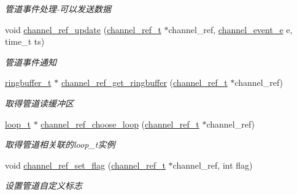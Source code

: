 \begin{DoxyCompactItemize}
\begin{DoxyCompactList}\small\item\em 管道事件处理-\/可以发送数据 \end{DoxyCompactList}\item 
void \hyperlink{a00047_aac9295d2423894326c8b62e0ee851f89_aac9295d2423894326c8b62e0ee851f89}{channel\+\_\+ref\+\_\+update} (\hyperlink{a00050_a151271c9d188ef28d4d24bb81dcc1263_a151271c9d188ef28d4d24bb81dcc1263}{channel\+\_\+ref\+\_\+t} $\ast$channel\+\_\+ref, \hyperlink{a00050_a5ad43ab162fdf9ad53cde10ed3d87d99_a5ad43ab162fdf9ad53cde10ed3d87d99}{channel\+\_\+event\+\_\+e} e, time\+\_\+t ts)
\begin{DoxyCompactList}\small\item\em 管道事件通知 \end{DoxyCompactList}\item 
\hyperlink{a00050_af929c5cf86b6a0f64dde407dfe60482e_af929c5cf86b6a0f64dde407dfe60482e}{ringbuffer\+\_\+t} $\ast$ \hyperlink{a00047_a7f81588a2beaa8c33a5eb7bf2236e566_a7f81588a2beaa8c33a5eb7bf2236e566}{channel\+\_\+ref\+\_\+get\+\_\+ringbuffer} (\hyperlink{a00050_a151271c9d188ef28d4d24bb81dcc1263_a151271c9d188ef28d4d24bb81dcc1263}{channel\+\_\+ref\+\_\+t} $\ast$channel\+\_\+ref)
\begin{DoxyCompactList}\small\item\em 取得管道读缓冲区 \end{DoxyCompactList}\item 
\hyperlink{a00050_a9c3ad1cd2de83e09f3a7b59fa82c94ee_a9c3ad1cd2de83e09f3a7b59fa82c94ee}{loop\+\_\+t} $\ast$ \hyperlink{a00047_af3fce9f1faac3773f726b1b913d42787_af3fce9f1faac3773f726b1b913d42787}{channel\+\_\+ref\+\_\+choose\+\_\+loop} (\hyperlink{a00050_a151271c9d188ef28d4d24bb81dcc1263_a151271c9d188ef28d4d24bb81dcc1263}{channel\+\_\+ref\+\_\+t} $\ast$channel\+\_\+ref)
\begin{DoxyCompactList}\small\item\em 取得管道相关联的loop\+\_\+t实例 \end{DoxyCompactList}\item 
void \hyperlink{a00047_a754666526c935285bd6c9367513b5832_a754666526c935285bd6c9367513b5832}{channel\+\_\+ref\+\_\+set\+\_\+flag} (\hyperlink{a00050_a151271c9d188ef28d4d24bb81dcc1263_a151271c9d188ef28d4d24bb81dcc1263}{channel\+\_\+ref\+\_\+t} $\ast$channel\+\_\+ref, int flag)
\begin{DoxyCompactList}\small\item\em 设置管道自定义标志 \end{DoxyCompactList}\item 

\end{DoxyCompactItemize}
